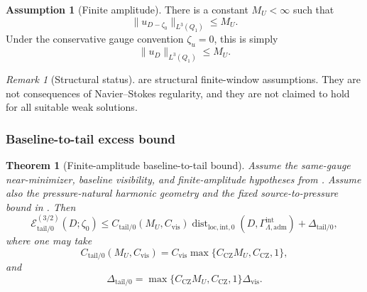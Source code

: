 \documentclass[11pt]{article}
\numberwithin{equation}{section}
\newtheorem{theorem}{Theorem}[section]
\theoremstyle{definition}
\newtheorem{assumption}[assumption]{Assumption}
\theoremstyle{remark}
\newtheorem{remark}[remark]{Remark}
\newcommand{\loc}{\mathrm{loc}}
\newcommand{\intg}{\mathrm{int}}
\newcommand{\tail}{\mathrm{tail}}
\newcommand{\adm}{\mathrm{adm}}
\newcommand{\CZ}{\mathrm{CZ}}
\newcommand{\Dist}{\operatorname{dist}}
\newcommand{\calE}{\mathcal E}
\newcommand{\Gammaadm}{\Gamma^{\intg}_{\Lambda,\adm}}
\begin{document}
\begin{assumption}[Finite amplitude]
\label{ass:finite-amplitude}
There is a constant \(M_U<\infty\) such that
\[
    \|u_{D-\zeta_0}\|_{L^3(Q_1)}
    \le
    M_U.
\]
Under the conservative gauge convention \(\zeta_u=0\), this is simply
\[
    \|u_{D}\|_{L^3(Q_1)}
    \le
    M_U.
\]
\end{assumption}

\begin{remark}[Structural status]
 are structural
finite-window assumptions.  They are not consequences of Navier--Stokes
regularity, and they are not claimed to hold for all suitable weak solutions.
\end{remark}

\subsubsection{Baseline-to-tail excess bound}
\label{sec:tail-bound}

\begin{theorem}[Finite-amplitude baseline-to-tail bound]
\label{thm:baseline-to-tail-working}
Assume the same-gauge near-minimizer, baseline visibility, and
finite-amplitude hypotheses from .
Assume also the pressure-natural harmonic geometry and the fixed
source-to-pressure bound in .  Then
\[
    \calE_{\tail/0}^{(3/2)}(D;\zeta_0)
    \le
    C_{\tail/0}(M_U,C_{\mathrm{vis}})
    \Dist_{\loc,\intg,0}(D,\Gammaadm)
    +
    \Delta_{\tail/0},
\]
where one may take
\[
    C_{\tail/0}(M_U,C_{\mathrm{vis}})
    =
    C_{\mathrm{vis}}
    \max\{C_{\CZ}M_U,C_{\CZ},1\},
\]
and
\[
    \Delta_{\tail/0}
    =
    \max\{C_{\CZ}M_U,C_{\CZ},1\}\Delta_{\mathrm{vis}}.
\]
\end{theorem}
\end{document}
